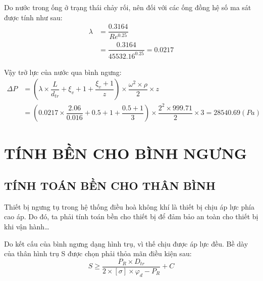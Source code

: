 Do nước trong ống ở trạng thái chảy rối, nên đối với các ống đồng hệ số ma sát được tính như sau:
\begin{equation*}
	\begin{split}
		\lambda &= \dfrac{0.3164}{Re^{0.25}}\\
		&=  \dfrac{0.3164}{45532.16^{0.25}}=0.0217
	\end{split}
\end{equation*}

Vậy trở lực của nước qua bình ngưng:
\begin{equation*}
	\begin{split}
		\Delta P &= \left(\lambda\times\dfrac{L}{d_{tr}} +\xi_{v} + 1 + \dfrac{\xi_{v} + 1}{z}\right)\times \dfrac{\omega^2\times\rho}{2}\times z\\
		&=  (0.0217 \times \dfrac{2.06}{0.016} + 0.5 + 1 + \dfrac{0.5+1}{3}) \times \dfrac{2^2 \times 999.71}{2} \times 3 = 28540.69(Pa)
	\end{split}
\end{equation*}

\section{TÍNH BỀN CHO BÌNH NGƯNG}
\subsection{TÍNH TOÁN BỀN CHO THÂN BÌNH}
Thiết bị ngưng tụ trong hệ thống điều hoà không khí là thiết bị chịu áp lực phía cao áp. Do đó, ta phải tính toán bền cho thiết bị để đảm bảo an toàn cho thiết bị khi vận hành…

Do kết cấu của bình ngưng dạng hình trụ, vì thế chịu được áp lực đều. Bề dày của thân hình trụ S được chọn phải thỏa mãn điều kiện sau:
\begin{equation*}
	S \geq \dfrac{P_{R}\times D_{tr}}{2\times [\sigma]\times\varphi_{d} - P_{R}} + C
\end{equation*}

